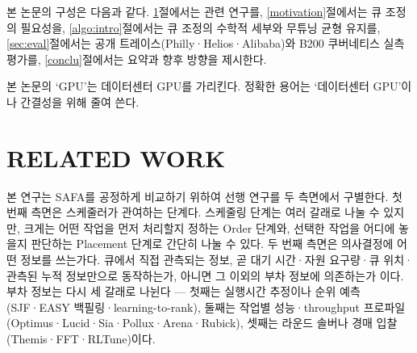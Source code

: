 \documentclass{ieeetj}
\begin{document}
본 논문의 구성은 다음과 같다. \ref{Related}절에서는 관련 연구를, \ref{motivation}절에서는 큐 조정의 필요성을, \ref{algo:intro}절에서는 큐 조정의 수학적 세부와 무튜닝 균형 유지를, \ref{sec:eval}절에서는 공개 트레이스(Philly·Helios·Alibaba)와 B200 쿠버네티스 실측 평가를, \ref{conclu}절에서는 요약과 향후 방향을 제시한다.

본 논문의 `GPU'는 데이터센터 GPU를 가리킨다. 정확한 용어는 `데이터센터 GPU'이나 간결성을 위해 줄여 쓴다.

\section{RELATED WORK}\label{Related}
본 연구는 SAFA를 공정하게 비교하기 위하여 선행 연구를 두 측면에서 구별한다. 첫 번째 측면은 스케줄러가 관여하는 단계다. 스케줄링 단계는 여러 갈래로 나눌 수 있지만, 크게는 어떤 작업을 먼저 처리할지 정하는 Order 단계와, 선택한 작업을 어디에 놓을지 판단하는 Placement 단계로 간단히 나눌 수 있다. 두 번째 측면은 의사결정에 어떤 정보를 쓰는가다. 큐에서 직접 관측되는 정보, 곧 대기 시간·자원 요구량·큐 위치·관측된 누적 정보만으로 동작하는가, 아니면 그 이외의 부차 정보에 의존하는가 이다. 부차 정보는 다시 세 갈래로 나뉜다 --- 첫째는 실행시간 추정이나 순위 예측(SJF·EASY 백필링·learning-to-rank), 둘째는 작업별 성능·throughput 프로파일(Optimus·Lucid·Sia·Pollux·Arena·Rubick), 셋째는 라운드 솔버나 경매 입찰(Themis·FFT·RLTune)이다.
\end{document}
